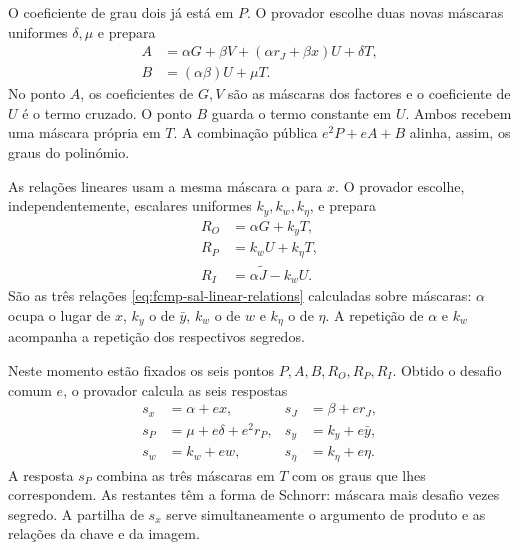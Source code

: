 O coeficiente de grau dois já está em \(P\). O provador escolhe
duas novas máscaras uniformes \(\delta,\mu\) e prepara
\begin{equation}
 \begin{aligned}
  A&=\alpha G+\beta V+(\alpha r_J+\beta x)U+\delta T,\\
  B&=(\alpha\beta)U+\mu T.
 \end{aligned}
 \label{eq:fcmp-sal-AB}
\end{equation}
No ponto \(A\), os coeficientes de \(G,V\) são as máscaras
dos factores e o coeficiente de \(U\) é o termo cruzado.
O ponto \(B\) guarda o termo constante em \(U\). Ambos recebem
uma máscara própria em \(T\). A combinação pública
\(e^2P+eA+B\) alinha, assim, os graus do polinómio.

As relações lineares usam a mesma máscara \(\alpha\) para
\(x\). O provador escolhe, independentemente, escalares
uniformes \(k_y,k_w,k_\eta\), e prepara
\begin{equation}
 \begin{aligned}
  R_O&=\alpha G+k_yT,\\
  R_P&=k_wU+k_\eta T,\\
  R_I&=\alpha\widetilde J-k_wU.
 \end{aligned}
 \label{eq:fcmp-sal-first-messages}
\end{equation}
São as três relações \eqref{eq:fcmp-sal-linear-relations}
calculadas sobre máscaras: \(\alpha\) ocupa o lugar de \(x\),
\(k_y\) o de \(\bar y\), \(k_w\) o de \(w\) e
\(k_\eta\) o de \(\eta\). A repetição de \(\alpha\) e
\(k_w\) acompanha a repetição dos respectivos segredos.

Neste momento estão fixados os seis pontos
\(P,A,B,R_O,R_P,R_I\). Obtido o desafio comum \(e\), o
provador calcula as seis respostas
\begin{equation}
 \begin{aligned}
  s_x&=\alpha+ex,&
  s_J&=\beta+er_J,\\
  s_P&=\mu+e\delta+e^2r_P,&
  s_y&=k_y+e\bar y,\\
  s_w&=k_w+ew,&
  s_\eta&=k_\eta+e\eta.
 \end{aligned}
 \label{eq:fcmp-sal-responses}
\end{equation}
A resposta \(s_P\) combina as três máscaras em \(T\) com
os graus que lhes correspondem. As restantes têm a forma de
Schnorr: máscara mais desafio vezes segredo. A partilha de
\(s_x\) serve simultaneamente o argumento de produto e as
relações da chave e da imagem.

